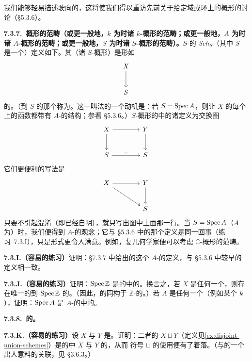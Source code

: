 我们能够轻易描述驶向\trAffineScheme{}的\trMorphism，这将使我们得以重访先前关于给定域或环上的概形的讨论（\S5.3.6）。

\textbf{7.3.7.\ \trComplex{}概形的范畴（或更一般地，$k$ 为\trField{}时诸 $k$-概形的范畴；或更一般地，$A$ 为\trRing{}时诸 $A$-概形的范畴；或更一般地，$S$ 为\trScheme{}时诸 $S$-概形的范畴）。}\quad $S$-\trScheme{}的\trCategory{} $\mathit{Sch}_S$（其中 $S$ 是一个\trScheme）定义如下。其\trObject（诸 $S$-概形）是形如
\[
\begin{tikzcd}[row sep=2.4em]
X \ar[d] \\
S
\end{tikzcd}
\]
的\trMorphism。（到 $S$ 的那个\trMorphism{}称为\textbf{\trStructureMorphism{}}。这一叫法的一个动机是：若 $S=\operatorname{Spec} A$，则\trStructureMorphism{}让 $X$ 的每个\trOpenSet{}上的函数都带有 $A$-\trAlgebra{}的结构；参看 \S5.3.6。）$S$-概形的\trCategory{}中的诸\trMorphism{}定义为交换图
\[
\begin{tikzcd}[row sep=2.4em, column sep=4em]
X \ar[r] \ar[d] & Y \ar[d] \\
S \ar[r, "="] & S
\end{tikzcd}
\]
它们更便利的写法是
\[
\begin{tikzcd}[row sep=2.4em, column sep=4em]
X \ar[r] \ar[dr] & Y \ar[d] \\
& S
\end{tikzcd}
\]
只要不引起混淆（即\trBase\trScheme{}已经自明），就只写出图中上面那一行。当 $S=\operatorname{Spec} A$（$A$ 为\trRing）时，我们便得到 $A$-\trScheme{}的观念；它与 \S5.3.6 中的那个定义是同一回事（练习~7.3.I），只是形式更令人满意。例如，复几何学家便可以考虑 $\mathbb{C}$-概形的范畴。

\textbf{7.3.I.（容易的练习）}\quad 证明：\S7.3.7 中给出的这个 $A$-\trScheme{}的定义，与 \S5.3.6 中较早的定义相一致。

\textbf{7.3.J.（容易的练习）}\quad 证明：$\operatorname{Spec}\mathbb{Z}$ 是\trScheme{}的\trCategory{}中的\trFinalObject。换言之，若 $X$ 是任何一个\trScheme，则存在唯一的到 $\operatorname{Spec}\mathbb{Z}$ 的\trMorphism。（因此，\trScheme{}的\trCategory{}同构于 $\mathbb{Z}$-\trScheme{}的\trCategory。）若 $A$ 是任何一个\trRing（例如某个\trField{} $k$），证明：$\operatorname{Spec} A$ 是 $A$-\trScheme{}的\trCategory{}中的\trFinalObject。

\textbf{7.3.8.\ \trScheme{}的\trCoproduct。}

\textbf{7.3.K.（容易的练习）}\quad 设 $X$ 与 $Y$ 是\trScheme。证明：二者的\trDisjointUnion{} $X\sqcup Y$（定义见\cref{ex:disjoint-union-schemes}）是\trScheme{}的\trCategory{}中 $X$ 与 $Y$ 的\trCoproduct，从而 \trCoproduct{}符号 $\sqcup$ 的使用便有了着落。（与\trIdempotent{}的一个出人意料的关联，见 \S3.6.3。）

